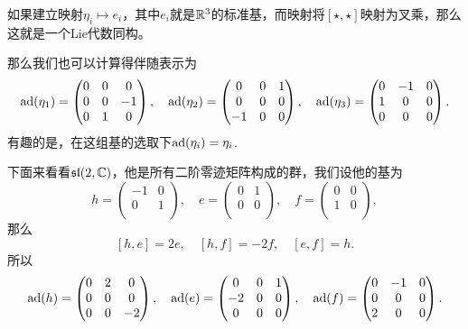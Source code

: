 如果建立映射$\eta_i\mapsto e_i$，其中$e_i$就是$\mathbb{R}^3$的标准基，而映射将$[\star,\star]$映射为叉乘，那么这就是一个Lie代数同构。

那么我们也可以计算得伴随表示为
\[
	\operatorname{ad}(\eta_1)=
		\begin{pmatrix}
			0&0&0\\
			0&0&-1\\
			0&1&0\\
		\end{pmatrix},\quad
	\operatorname{ad}(\eta_2)=
		\begin{pmatrix}
			0&0&1\\
			0&0&0\\
			-1&0&0\\
		\end{pmatrix},\quad
	\operatorname{ad}(\eta_3)=
		\begin{pmatrix}
			0&-1&0\\
			1&0&0\\
			0&0&0\\
		\end{pmatrix}.
\]
有趣的是，在这组基的选取下$\operatorname{ad}(\eta_i)=\eta_i$.

下面来看看$\mathfrak{sl}(2,\mathbb{C})$，他是所有二阶零迹矩阵构成的群，我们设他的基为
\[
h=\begin{pmatrix}
	-1&0\\
	0&1\\
\end{pmatrix},\quad
e=\begin{pmatrix}
	0&1\\
	0&0\\
\end{pmatrix},\quad
f=\begin{pmatrix}
	0&0\\
	1&0\\
\end{pmatrix},
\]
那么
\[
[h,e]=2e,\quad[h,f]=-2f,\quad[e,f]=h.
\]
所以
\[
	\operatorname{ad}(h)=
		\begin{pmatrix}
			0&2&0\\
			0&0&0\\
			0&0&-2\\
		\end{pmatrix},\quad
	\operatorname{ad}(e)=
		\begin{pmatrix}
			0&0&1\\
			-2&0&0\\
			0&0&0\\
		\end{pmatrix},\quad
	\operatorname{ad}(f)=
		\begin{pmatrix}
			0&-1&0\\
			0&0&0\\
			2&0&0\\
		\end{pmatrix}.
\]

